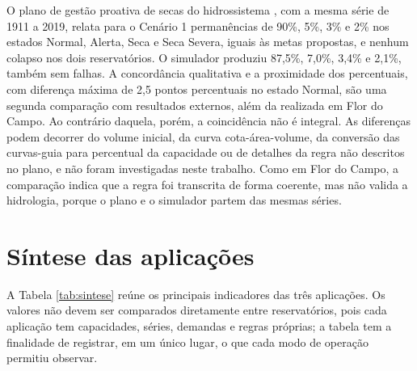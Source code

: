 O plano de gestão proativa de secas do hidrossistema \cite{pgpsFogareiroQuixeramobim2023}, com a mesma série de 1911 a 2019, relata para o Cenário 1 permanências de 90\%, 5\%, 3\% e 2\% nos estados Normal, Alerta, Seca e Seca Severa, iguais às metas propostas, e nenhum colapso nos dois reservatórios. O simulador produziu 87,5\%, 7,0\%, 3,4\% e 2,1\%, também sem falhas. A concordância qualitativa e a proximidade dos percentuais, com diferença máxima de 2,5 pontos percentuais no estado Normal, são uma segunda comparação com resultados externos, além da realizada em Flor do Campo. Ao contrário daquela, porém, a coincidência não é integral. As diferenças podem decorrer do volume inicial, da curva cota-área-volume, da conversão das curvas-guia para percentual da capacidade ou de detalhes da regra não descritos no plano, e não foram investigadas neste trabalho. Como em Flor do Campo, a comparação indica que a regra foi transcrita de forma coerente, mas não valida a hidrologia, porque o plano e o simulador partem das mesmas séries.

\section{Síntese das aplicações}
\label{sec:sintese-aplicacoes}

A Tabela \ref{tab:sintese} reúne os principais indicadores das três aplicações. Os valores não devem ser comparados diretamente entre reservatórios, pois cada aplicação tem capacidades, séries, demandas e regras próprias; a tabela tem a finalidade de registrar, em um único lugar, o que cada modo de operação permitiu observar.

